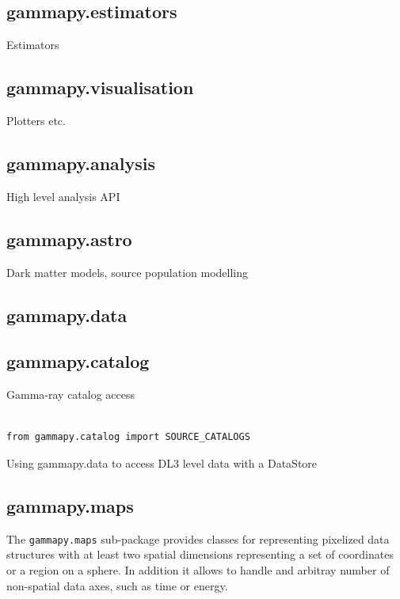 \subsection{gammapy.estimators}
Estimators

\subsection{gammapy.visualisation}
Plotters etc.

\subsection{gammapy.analysis}
High level analysis API

\subsection{gammapy.astro}
Dark matter models, source population modelling

\subsection{gammapy.data}

\subsection{gammapy.catalog}
Gamma-ray catalog access

\begin{listing}
\begin{verbatim}

from gammapy.catalog import SOURCE_CATALOGS

\end{verbatim}
\caption{Using gammapy.data to access DL3 level data with a DataStore}
\label{codeexample:data}
\end{listing}


\subsection{gammapy.maps}
The \verb|gammapy.maps| sub-package provides classes for representing pixelized
data structures with at least two spatial dimensions representing a set of
coordinates or a region on a sphere. In addition it allows to handle and arbitray
number of non-spatial data axes, such as time or energy.

